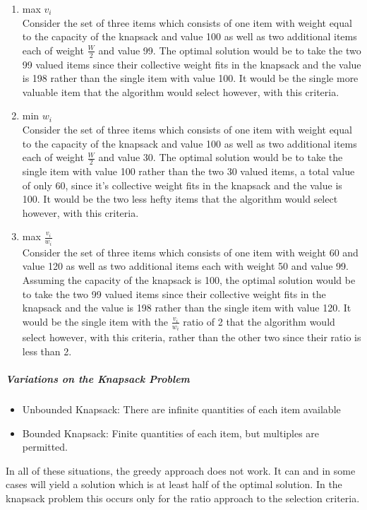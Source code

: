 \documentclass[12pt,letterpaper]{article}
\begin{document}
\begin{enumerate}
\item max $v_i$\\
Consider the set of three items which consists of one item with weight equal to the capacity of the knapsack and value 100 as well as two additional items each of weight $\frac{W}{2}$ and value 99. The optimal solution would be to take the two 99 valued items since their collective weight fits in the knapsack and the value is 198 rather than the single item with value 100. It would be the single more valuable item that the algorithm would select however, with this criteria.  
\item min $w_i$\\
Consider the set of three items which consists of one item with weight equal to the capacity of the knapsack and value 100 as well as two additional items each of weight $\frac{W}{2}$ and value 30. The optimal solution would be to take the single item with value 100 rather than the two 30 valued items, a total value of only 60, since it's collective weight fits in the knapsack and the value is 100. It would be the two less hefty items that the algorithm would select however, with this criteria. 
\item max $\frac{v_i}{w_i}$\\
Consider the set of three items which consists of one item with weight 60 and value 120 as well as two additional items each with weight 50 and value 99. Assuming the capacity of the knapsack is 100, the optimal solution would be to take the two 99 valued items since their collective weight fits in the knapsack and the value is 198 rather than the single item with value 120. It would be the single item with the $\frac{v_i}{w_i}$ ratio of 2 that the algorithm would select however, with this criteria, rather than the other two since their ratio is less than 2. 
\end{enumerate}
\subparagraph{Variations on the Knapsack Problem}
\begin{itemize}
\item Unbounded Knapsack: There are infinite quantities of each item available
\item Bounded Knapsack: Finite quantities of each item, but multiples are permitted. 
\end{itemize}
In all of these situations, the greedy approach does not work. It can and in some cases will yield a solution which is at least half of the optimal solution. In the knapsack problem this occurs only for the ratio approach to the selection criteria. 
\end{document}
